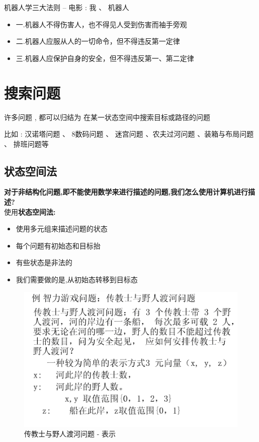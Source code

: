 \documentclass[UTF8,a4paper]{ctexart}
\begin{document}
机器人学三大法则 -- 电影 : 我 、 机器人
\begin{itemize}
	\item 一.机器人不得伤害人，也不得见人受到伤害而袖手旁观
	\item 二.机器人应服从人的一切命令，但不得违反第一定律
	\item 三.机器人应保护自身的安全，但不得违反第一、第二定律
\end{itemize}

\section{搜索问题}
许多问题 , 都可以归结为 在某一状态空间中搜索目标或路径的问题

比如 : 汉诺塔问题 、 8数码问题 、 迷宫问题 、农夫过河问题 、装箱与布局问题 、 排班问题等

\subsection{状态空间法}

\textbf{对于非结构化问题,即不能使用数学来进行描述的问题,我们怎么使用计算机进行描述?}\\
使用\textbf{状态空间法:}
\begin{itemize}
	\item 使用多元组来描述问题的状态
	\item 每个问题有初始态和目标抬
	\item 有些状态是非法的
	\item 我们需要做的是,从初始态转移到目标态
\end{itemize}

\begin{figure}[H]
	\centering
	\includegraphics[scale = 0.6]{assets/ArtificialIntelligence_8e77e.png}
	\caption{传教士与野人渡河问题 - 表示}
\end{figure}
\end{document}
